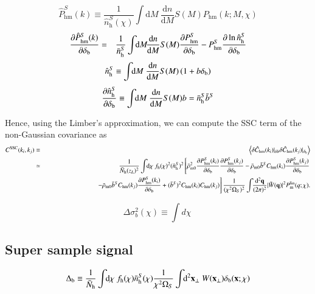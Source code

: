 \documentclass[onecolumn,notitlepage,showpacs,amsmath,amssymb,prd,floatfix]{revtex4-1}
\def\ave#1{\left\langle #1 \right\rangle}
\newcommand{\bx}{{\bf x}}
\newcommand{\bq}{{\bf q}}
\newcommand{\tW}{\tilde{W}}
\newcommand{\dr}{\mathrm{d}}
\newcommand{\deltab}{\delta_{\rm b}}
\newcommand{\phm}{P_{\mathrm{hm}}}
\newcommand{\hphm}{\hat{P}_{\mathrm{hm}}}
\newcommand{\chm}{C_{\mathrm{hm}}}
\newcommand{\hchm}{\hat{C}_{\mathrm{hm}}}
\newcommand{\bnh}{\frac{\dr n}{\dr M}}
\newcommand{\bnhs}{\bar{n}_{\rm h}^S}
\newcommand{\pml}{P^{\rm lin}_{\rm m}}
\newcommand{\bNh}{\bar{N}_{\rm h}}
\newcommand{\hnh}{\hat{n}_{\mathrm{h}}}
\begin{document}
\begin{equation}
 \hphm^S(k)\equiv \frac{1}{\hnh^S(\chi)}\int\!\!\dr M~\bnh S(M)\phm(k;M,\chi)
\end{equation}
%
\begin{eqnarray}
\frac{\partial \hphm^S(k)}{\partial \deltab}&=&\frac{1}{\bnhs}\int\!\!\dr
 M\!\bnh S(M)\frac{\partial \phm^S}{\partial  \deltab}
-\phm^S\frac{\partial \ln \hnh^S}{\partial \deltab}
\end{eqnarray}
%
\begin{equation}
 \hnh^S \equiv \int\!\!\dr M~ \bnh S(M)\left(1+b\deltab\right)
\end{equation}
%
\begin{equation}
 \frac{\partial \hnh^S}{\partial \deltab}\equiv \int\!\!\dr M~ \bnh
  S(M)b = \bnhs \bar{b}^S
\end{equation}



Hence, using the Limber's approximation, we can compute the SSC term of
the non-Gaussian covariance as
%
\begin{eqnarray}
 C^{\rm SSC}(k_i,k_j)&\equiv& \ave{\delta\hchm(k_i)|_{\delta
  b}\delta\hchm(k_j)|_{\deltab}}\nonumber\\
  &\simeq &\frac{1}{\bNh(z_L)^2}
  \int\!\!\dr\chi~f_{\rm h}(\chi)^2(\bnhs)^2\left[
  \bar{\rho}_{\rm m0}^2\frac{\partial \phm^S(k_i)}{\partial \deltab}
  \frac{\partial \phm^S(k_j)}{\partial \deltab}
  -\bar{\rho}_{\rm m0}\bar{b}^S
  \chm(k_i)\frac{\partial \phm^S(k_j)}{\partial
  \deltab}\right.\nonumber\\
 &&\hspace{8em}\left.
-\bar{\rho}_{\rm m0}\bar{b}^S\chm(k_j)\frac{\partial \phm^S(k_i)}{\partial \deltab}
+(\bar{b}^S)^2\chm(k_i)\chm(k_j)
		\right]\frac{1}{(\chi^2\Omega_S)^2}\int\!\!\frac{\dr^2\bq}{(2\pi)^2}|\tW(\bq)|^2\pml(q;\chi).
\end{eqnarray}
%
\cite{TakadaSpergel:13,Schaanetal:14}

\begin{equation}
\Delta\sigma_b^2(\chi)\equiv \int\!\!d\chi~
\end{equation}

\subsection{Super sample signal}

\begin{equation}
\Delta_{\rm b}\equiv \frac{1}{\bNh}\int\!\!\dr\chi~f_{\rm
 h}(\chi)\bnhs(\chi)\frac{1}{\chi^2\Omega_S}
 \int\!\!\dr^2\bx_\perp~ W(\bx_\perp)\deltab(\bx;\chi)
\end{equation}
%
\end{document}
